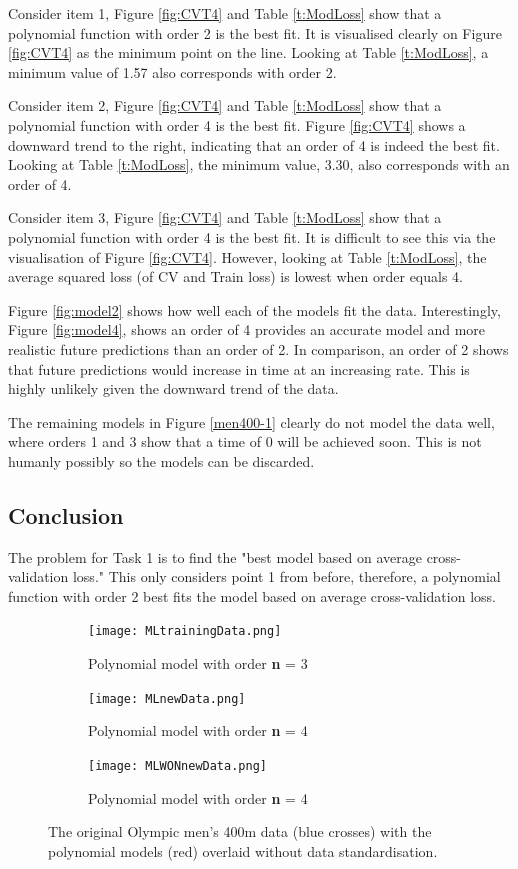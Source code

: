 {Consider item 1, Figure \ref{fig:CVT4} and Table \ref{t:ModLoss} show that a polynomial function with order 2 is the best fit. It is visualised clearly on Figure \ref{fig:CVT4} as the minimum point on the line. Looking at Table \ref{t:ModLoss}, a minimum value of 1.57 also corresponds with order 2.

Consider item 2, Figure \ref{fig:CVT4} and Table \ref{t:ModLoss} show that a polynomial function with order 4 is the best fit. Figure \ref{fig:CVT4} shows a downward trend to the right, indicating that an order of 4 is indeed the best fit. Looking at Table \ref{t:ModLoss}, the minimum value, 3.30, also corresponds with an order of 4.

Consider item 3, Figure \ref{fig:CVT4} and Table \ref{t:ModLoss} show that a polynomial function with order 4 is the best fit. It is difficult to see this via the visualisation of Figure \ref{fig:CVT4}. However, looking at Table \ref{t:ModLoss}, the average squared loss (of CV and Train loss) is lowest when order equals 4. 

Figure \ref{fig:model2} shows how well each of the models fit the data. Interestingly, Figure \ref{fig:model4}, shows an order of 4 provides an accurate model and more realistic future predictions than an order of 2. In comparison, an order of 2 shows that future predictions would increase in time at an increasing rate. This is highly unlikely given the downward trend of the data.

The remaining models in Figure \ref{men400-1} clearly do not model the data well, where orders 1 and 3 show that a time of 0 will be achieved soon. This is not humanly possibly so the models can be discarded. 

\subsection{Conclusion}
The problem for Task 1 is to find the "best model based on average cross-validation loss." This only considers point 1 from before, therefore, a polynomial function with order 2 best fits the model based on average cross-validation loss.

\begin{figure}[h!] 
	\centering
	\begin{subfigure}[b]{0.4\textwidth}
		\texttt{[image: MLtrainingData.png]}
		\caption{Polynomial model with order \textbf{n} = 3}
		\label{fig:modelNoReg0}
	\end{subfigure}
	\begin{subfigure}[b]{0.4\textwidth}
		\texttt{[image: MLnewData.png]}
		\caption{Polynomial model with order \textbf{n} = 4}
		\label{fig:modelNoReg1}
	\end{subfigure}
	\begin{subfigure}[b]{0.4\textwidth}
	\texttt{[image: MLWONnewData.png]}
	\caption{Polynomial model with order \textbf{n} = 4}
	\label{fig:modelNoReg1}
	\end{subfigure}
	\caption{The original Olympic men's 400m data (blue crosses) with the polynomial models (red) overlaid without data standardisation.}
	\label{men400-1noSt}
\end{figure}

}
